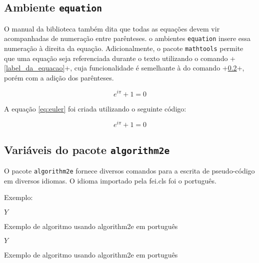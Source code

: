 \documentclass[xindy,rascunho]{fei}
\begin{document}
	\subsection{Ambiente \texttt{equation}}
	
	O manual da biblioteca também dita que todas as equações devem vir acompanhadas de numeração entre parênteses. o ambientes \texttt{equation} insere essa numeração à direita da equação. Adicionalmente, o pacote \texttt{mathtools} permite que uma equação seja referenciada durante o texto utilizando o comando \latexinline+\eqref{label_da_equacao}+, cuja funcionalidade é semelhante à do comando \latexinline+\ref{}+, porém com a adição dos parênteses.
	
	\begin{equation} \label{eq:euler}
	e^{i\pi}+1=0
	\end{equation}
	
	A equação \eqref{eq:euler} foi criada utilizando o seguinte código:
	
	\begin{latexcode}
	\begin{equation} \label{eq:euler}
	e^{i\pi}+1=0
	\end{equation}	
	\end{latexcode}
    
    \subsection{Variáveis do pacote \texttt{algorithm2e}}
    
    O pacote \texttt{algorithm2e} fornece diversos comandos para a escrita de pseudo-código em diversos idiomas. O idioma importado pela fei.cls foi o português.
    
    Exemplo:

\begin{latexcode}
\begin{algorithm}
	\Retorna \(Y\)
	\caption{Exemplo de algoritmo usando algorithm2e em português}
	\label{lst:alg}
\end{algorithm}
\end{latexcode}
    
\begin{algorithm}


\Retorna \(Y\)

\caption{Exemplo de algoritmo usando algorithm2e em português}
\label{lst:alg}
\end{algorithm}
\end{document}
